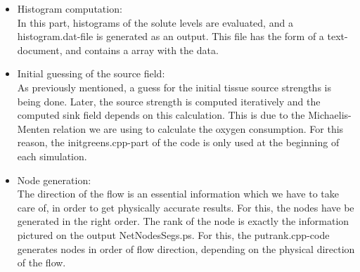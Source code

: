 \begin{itemize}
\\ \item Histogram computation:
\\In this part, histograms of the solute levels are evaluated, and a histogram.dat-file is generated as an output. This file has the form of a text-document, and contains a array with the data.
\\ \item Initial guessing of the source field:
\\As previously mentioned, a guess for the initial tissue source strengths is being done. Later, the source strength is computed iteratively and the computed sink field depends on this calculation. This is due to the Michaelis-Menten relation we are using to calculate the oxygen consumption. For this reason, the initgreens.cpp-part of the code is only used at the beginning of each simulation.
\\ \item Node generation:
\\The direction of the flow is an essential information which we have to take care of, in order to get physically accurate results. For this, the nodes have be generated in the right order. The rank of the node is exactly the information pictured on the output NetNodesSegs.ps. For this, the putrank.cpp-code generates nodes in order of flow direction, depending on the physical direction of the flow.

\end{itemize}
